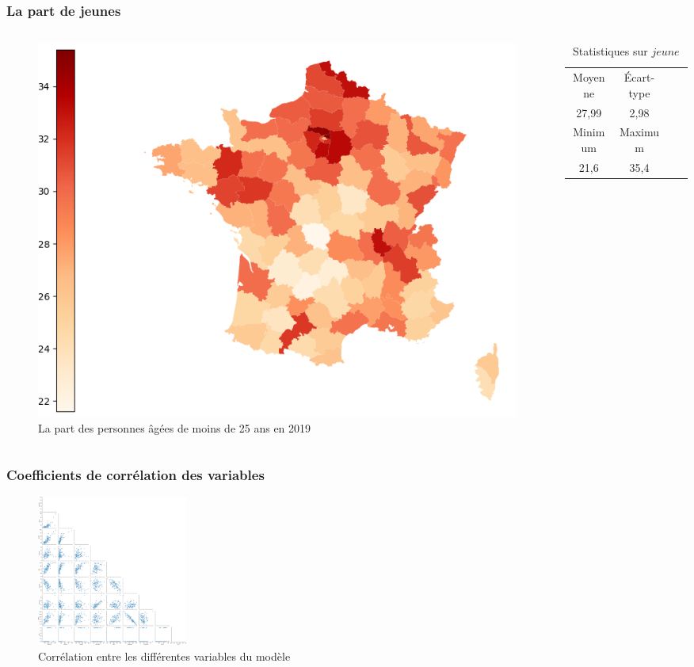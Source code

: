 \documentclass{beamer}
\begin{document}
\begin{frame}
    \frametitle{La part de jeunes}
    \begin{columns}
    \begin{column}{0.5\textwidth}
        \centering
        \begin{figure}
            \includegraphics[width=\textwidth]{jeune.png}
            \caption{La part des personnes âgées de moins de 25 ans en 2019}
        \end{figure}
    \end{column}
    
    \begin{column}{0.5\textwidth}
    \begin{table}[H]
        \caption*{Statistiques sur $jeune$}
        \begin{tabular}{cccc}
        \toprule
        Moyenne  & Écart-type   \\ 
        27,99 &   2,98   \\
        \midrule
        Minimum & Maximum   \\ 
        21,6    & 35,4      \\
        \bottomrule
        \end{tabular}
    \end{table}
    \end{column}
    
    \end{columns}
\end{frame}

\begin{frame}
    \frametitle{Coefficients de corrélation des variables}
    \begin{figure}
        \includegraphics[max height=187px,max width=187px]{corr.png}
         \caption{Corrélation entre les différentes variables du modèle}
    \end{figure}
\end{frame}
\end{document}
